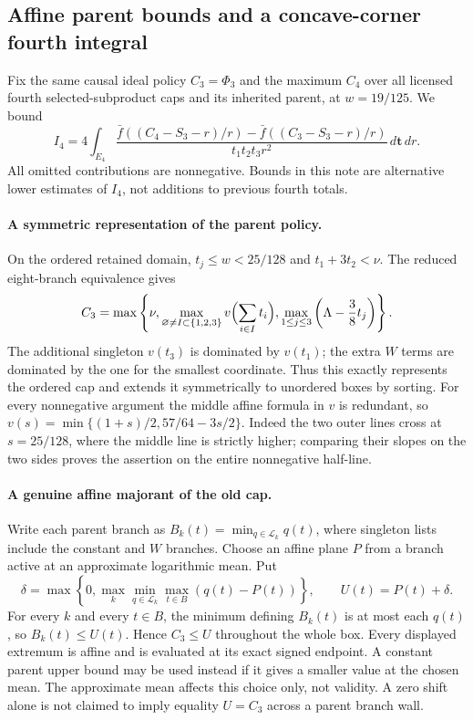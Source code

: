 \subsection{Affine parent bounds and a concave-corner fourth integral}

Fix the same causal ideal policy $C_3=\Phi_3$ and the maximum $C_4$
over all licensed fourth selected-subproduct caps and its inherited
parent, at $w=19/125$. We bound
\[
 I_4=4\int_{E_4}
 \frac{\bar f((C_4-S_3-r)/r)-\bar f((C_3-S_3-r)/r)}
 {t_1t_2t_3r^2}\,d\boldsymbol t\,dr.
\]
All omitted contributions are nonnegative. Bounds in this note are
alternative lower estimates of $I_4$, not additions to previous
fourth totals.

\paragraph{A symmetric representation of the parent policy.}
On the ordered retained domain, $t_j\le w<25/128$ and
$t_1+3t_2<\nu$. The reduced eight-branch equivalence gives
\[
 C_3=\max\left\{\nu,
    \max_{\varnothing\ne I\subset\{1,2,3\}}v\Bigl(\sum_{i\in I}t_i\Bigr),
    \max_{1\le j\le3}\left(\Lambda-\frac38t_j\right)\right\}.
\]
The additional singleton $v(t_3)$ is dominated by $v(t_1)$;
the extra $W$ terms are dominated by the one for the smallest
coordinate. Thus this exactly represents the ordered cap and
extends it symmetrically to unordered boxes by sorting.
For every nonnegative argument the middle affine formula in $v$
is redundant, so
$v(s)=\min\{(1+s)/2,57/64-3s/2\}$.
Indeed the two outer lines cross at $s=25/128$, where the middle
line is strictly higher; comparing their slopes on the two sides
proves the assertion on the entire nonnegative half-line.

\paragraph{A genuine affine majorant of the old cap.}
Write each parent branch as $B_k(t)=\min_{q\in\mathcal L_k}q(t)$,
where singleton lists include the constant and $W$ branches.
Choose an affine plane $P$ from a branch active at an approximate
logarithmic mean. Put
\[
 \delta=\max\left\{0,
     \max_k\min_{q\in\mathcal L_k}\max_{t\in B}(q(t)-P(t))\right\},
 \qquad U(t)=P(t)+\delta.
\]
For every $k$ and every $t\in B$, the minimum defining $B_k(t)$
is at most each $q(t)$, so $B_k(t)\le U(t)$. Hence $C_3\le U$
throughout the whole box. Every displayed extremum is affine and
is evaluated at its exact signed endpoint. A constant parent upper
bound may be used instead if it gives a smaller value at the chosen
mean. The approximate mean affects this choice only, not validity.
A zero shift alone is not claimed to imply equality $U=C_3$ across
a parent branch wall.

